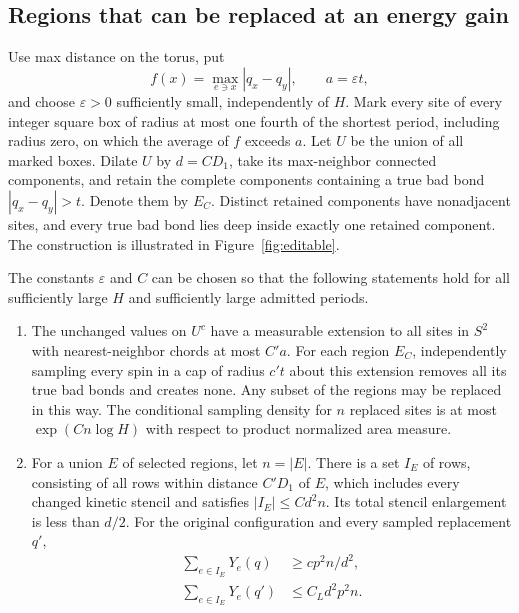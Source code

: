 \subsection{Regions that can be replaced at an energy gain}

Use max distance on the torus, put
\[
 f(x)=\max_{e\ni x}|q_x-q_y|,
 \qquad a=\varepsilon t,
\]
and choose $\varepsilon>0$ sufficiently small, independently of $H$.
Mark every site of every integer square box of radius at most one
fourth of the shortest period, including radius zero, on which the
average of $f$ exceeds $a$. Let $U$ be the union of all marked boxes.
Dilate $U$ by $d=CD_1$, take its max-neighbor connected components,
and retain the complete components containing a true bad bond
$|q_x-q_y|>t$. Denote them by $E_C$. Distinct retained components have
nonadjacent sites, and every true bad bond lies deep inside exactly
one retained component. The construction is illustrated in
Figure~\ref{fig:editable}.


\FloatBarrier

\begin{lemma}
\label{lem:editable-regions}
The constants $\varepsilon$ and $C$ can be chosen so that the
following statements hold for all sufficiently large $H$ and
sufficiently large admitted periods.
\begin{enumerate}[label=\textup{(\roman*)}]
\item The unchanged values on $U^c$ have a measurable extension to all
sites in $S^2$ with nearest-neighbor chords at most $C'a$. For each
region $E_C$, independently sampling every spin in a cap of radius
$c't$ about this extension removes all its true bad bonds and creates
none. Any subset of the regions may be replaced in this way. The
conditional sampling density for $n$ replaced sites is at most
$\exp(Cn\log H)$ with respect to product normalized area measure.
\item For a union $E$ of selected regions, let $n=|E|$. There is a set
$I_E$ of rows, consisting of all rows within distance $C'D_1$ of $E$,
which includes every changed kinetic stencil and satisfies
$|I_E|\le Cd^2n$. Its total stencil enlargement is less than $d/2$.
For the original configuration and every sampled replacement $q'$,
\begin{align}
 \sum_{e\in I_E}Y_e(q)&\ge cp^2n/d^2,
 \label{eq:orig-20}\\
 \sum_{e\in I_E}Y_e(q')&\le C_Ld^2p^2n.
 \label{eq:orig-21}
\end{align}
\end{enumerate}
\end{lemma}


